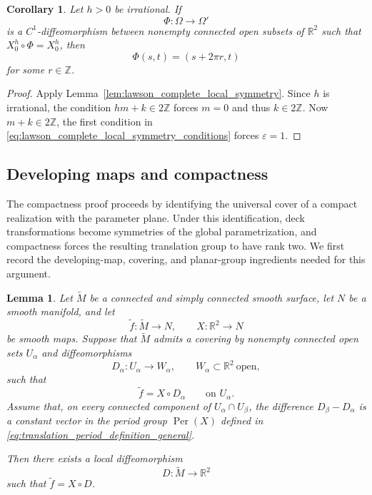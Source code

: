 \documentclass[a4paper,11pt]{amsart}
\numberwithin{equation}{section}
\theoremstyle{plain}
\newtheorem{lem}[thm]{Lemma}
\newtheorem{coro}[thm]{Corollary}
\begin{document}
\begin{coro}\label{cor:lawson_irrational_rigidity}
Let $h>0$ be irrational. If
\[
\Phi:\Omega\longrightarrow\Omega'
\]
is a $C^1$-diffeomorphism between nonempty connected open subsets of
$\mathbb R^2$ such that $X_0^h\circ\Phi=X_0^h$, then
\[
\Phi(s,t)=(s+2\pi r,t)
\]
for some $r\in\mathbb Z$.
\end{coro}

\begin{proof}
Apply Lemma~\ref{lem:lawson_complete_local_symmetry}. Since $h$ is
irrational, the condition $hm+k\in2\mathbb Z$ forces $m=0$
and thus $k\in2\mathbb Z$. Now $m+k\in2\mathbb Z$, the first condition in
\eqref{eq:lawson_complete_local_symmetry_conditions} forces $\varepsilon=1$.
\end{proof}

\subsection{Developing maps and compactness}

The compactness proof proceeds by identifying the universal cover of a
compact realization with the parameter plane. Under this identification,
deck transformations become symmetries of the global parametrization, and
compactness forces the resulting translation group to have rank two. We
first record the developing-map, covering, and planar-group ingredients
needed for this argument.

\begin{lem}
\label{lem:translational_developing_map}
Let $\widetilde M$ be a connected and simply connected smooth surface,
let $N$ be a smooth manifold, and let
\[
\widetilde f:\widetilde M\longrightarrow N,
\qquad
X:\mathbb R^2\longrightarrow N
\]
be smooth maps. Suppose that $\widetilde M$ admits a covering by
nonempty connected open sets $U_\alpha$ and diffeomorphisms
\[
D_\alpha:U_\alpha\longrightarrow W_\alpha,
\qquad W_\alpha\subset\mathbb R^2\ \text{open},
\]
such that
\[
\widetilde f=X\circ D_\alpha
\qquad\text{on }U_\alpha.
\]
Assume that, on every connected component of
$U_\alpha\cap U_\beta$, the difference $D_\beta-D_\alpha$ is a
constant vector in the period group
$\operatorname{Per}(X)$ defined in
\eqref{eq:translation_period_definition_general}.

Then there exists a local diffeomorphism
\[
D:\widetilde M\longrightarrow\mathbb R^2
\]
such that $\widetilde f=X\circ D$.
\end{lem}
\end{document}
